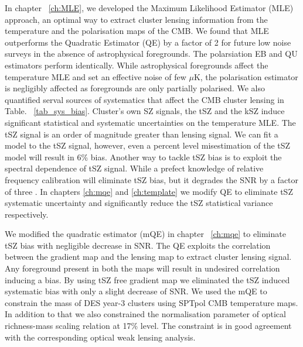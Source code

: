 In chapter ~\ref{ch:MLE}, we developed the Maximum Likelihood Estimator (MLE) approach, an optimal way to extract cluster lensing information from the temperature and the polarisation maps of the CMB.	  
We found that MLE outperforms the Quadratic Estimator (QE) by a factor of 2 for future low noise surveys in the absence of astrophysical foregrounds. 
The polarsiation EB and QU estimators perform identically. 
While astrophysical foregrounds affect the temperature MLE and set an effective noise of few $\mu$K, the polarisation estimator is negligibly affected as foregrounds are only partially polarised.
We also quantified serval sources of systematics that affect the CMB cluster lensing in Table. ~\ref{tab_sys_bias}.
Cluster's own SZ signals, the tSZ and the kSZ induce significant statistical and systematic uncertainties on the temperature MLE. 
The tSZ signal is an order of magnitude greater than lensing signal. 
We can fit a model to the tSZ signal, however, even a percent level misestimation of the tSZ model will result in 6\% bias.
Another way to tackle tSZ bias is to exploit the spectral dependence of tSZ signal. 
While a prefect knowledge of relative frequency calibration will eliminate tSZ bias, but it degrades the SNR by a factor of three \citep{baxter15}.
 In chapters \ref{ch:mqe} and \ref{ch:template} we modify QE to eliminate tSZ systematic uncertainty and significantly reduce the tSZ statistical variance respectively.
   
We modified the quadratic estimator (mQE) in chapter ~\ref{ch:mqe} to eliminate tSZ bias with negligible decrease in SNR. 
The QE exploits the correlation between the gradient map and the lensing map to extract cluster lensing signal.
Any foreground present in both the maps will result in undesired correlation inducing a bias. 
By using tSZ free gradient map we eliminated the tSZ induced systematic bias with only a slight decrease of SNR. 
 We used the mQE to constrain the mass of DES year-3  clusters using SPTpol CMB temperature maps. 
 In addition to that we also constrained the normalisation parameter of optical richness-mass scaling relation at 17\% level. 
 The constraint is in good agreement with the corresponding optical weak lensing analysis.
 
